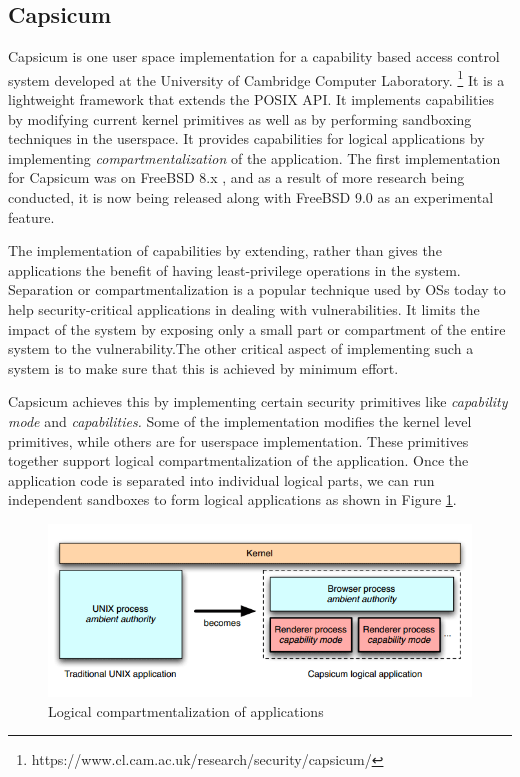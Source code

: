 \subsection{Capsicum}
\label{subsec:capsicum}

Capsicum is one user space implementation for a capability based access control system developed at the University of Cambridge Computer Laboratory. \footnote{https://www.cl.cam.ac.uk/research/security/capsicum/} It is a lightweight framework that extends the POSIX API. It implements capabilities by modifying current kernel primitives as well as by performing sandboxing techniques in the userspace. It provides capabilities for logical applications by implementing \textit{compartmentalization} of the application. The first implementation for Capsicum was on FreeBSD 8.x \cite{watson2010capsicum}, and as a result of more research being conducted, it is now being released along with FreeBSD 9.0 as an experimental feature.

The implementation of capabilities by extending, rather than gives the applications the benefit of having least-privilege operations in the system. Separation or compartmentalization is a popular technique used by OSs today to help security-critical applications in dealing with vulnerabilities. It limits the impact of the system by exposing only a small part or compartment of the entire system to the vulnerability.The other critical aspect of implementing such a system is to make sure that this is achieved by minimum effort.

Capsicum achieves this by implementing certain security primitives like \textit{capability mode} and \textit{capabilities.} Some of the implementation modifies the kernel level primitives, while others are for userspace implementation. These primitives together support logical compartmentalization of the application. Once the application code is separated into individual logical parts, we can run independent sandboxes to form logical applications as shown in Figure \ref{compartment}.

\begin{figure}[h]
\centering
\includegraphics[scale=0.45]{img/capcisum_sandbox}
\caption{Logical compartmentalization of applications}
\label{compartment}
\end{figure}

